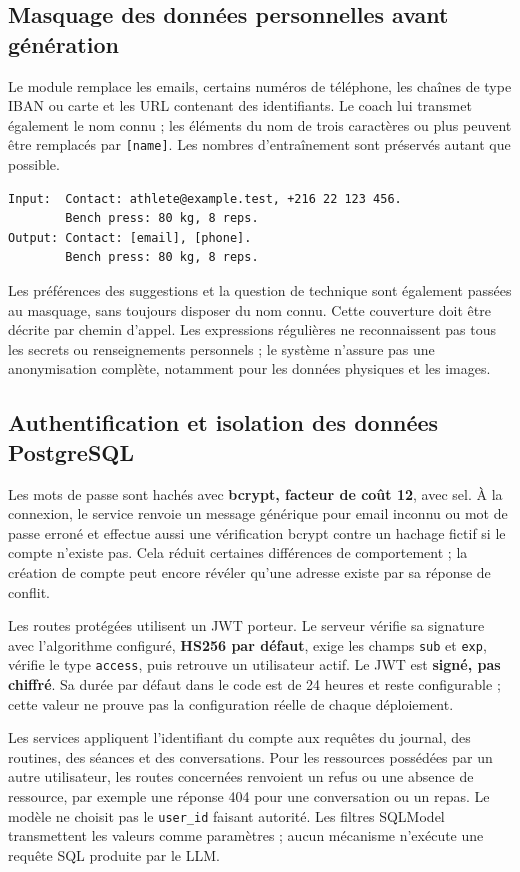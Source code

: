 \subsection{Masquage des données personnelles avant génération}
Le module  remplace les emails, certains numéros de téléphone, les chaînes de type IBAN ou carte et les URL contenant des identifiants. Le coach lui transmet également le nom connu ; les éléments du nom de trois caractères ou plus peuvent être remplacés par \texttt{[name]}. Les nombres d'entraînement sont préservés autant que possible.

\begin{lstlisting}[caption={Exemple illustratif de pseudonymisation du texte libre}]
Input:  Contact: athlete@example.test, +216 22 123 456.
        Bench press: 80 kg, 8 reps.
Output: Contact: [email], [phone].
        Bench press: 80 kg, 8 reps.
\end{lstlisting}
Les préférences des suggestions et la question de technique sont également passées au masquage, sans toujours disposer du nom connu. Cette couverture doit être décrite par chemin d'appel. Les expressions régulières ne reconnaissent pas tous les secrets ou renseignements personnels ; le système n'assure pas une anonymisation complète, notamment pour les données physiques et les images.

\clearpage
\subsection{Authentification et isolation des données PostgreSQL}
Les mots de passe sont hachés avec \textbf{bcrypt, facteur de coût 12}, avec sel. À la connexion, le service renvoie un message générique pour email inconnu ou mot de passe erroné et effectue aussi une vérification bcrypt contre un hachage fictif si le compte n'existe pas. Cela réduit certaines différences de comportement ; la création de compte peut encore révéler qu'une adresse existe par sa réponse de conflit.

Les routes protégées utilisent un JWT porteur. Le serveur vérifie sa signature avec l'algorithme configuré, \textbf{HS256 par défaut}, exige les champs \texttt{sub} et \texttt{exp}, vérifie le type \texttt{access}, puis retrouve un utilisateur actif. Le JWT est \textbf{signé, pas chiffré}. Sa durée par défaut dans le code est de 24 heures et reste configurable ; cette valeur ne prouve pas la configuration réelle de chaque déploiement.

Les services appliquent l'identifiant du compte aux requêtes du journal, des routines, des séances et des conversations. Pour les ressources possédées par un autre utilisateur, les routes concernées renvoient un refus ou une absence de ressource, par exemple une réponse 404 pour une conversation ou un repas. Le modèle ne choisit pas le \texttt{user\_id} faisant autorité. Les filtres SQLModel transmettent les valeurs comme paramètres ; aucun mécanisme n'exécute une requête SQL produite par le LLM.

